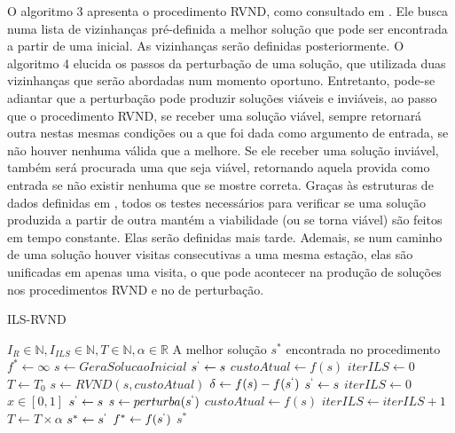 \par O algoritmo 3 apresenta o procedimento RVND, como consultado em \citep{art:REF_ART_7}. Ele busca numa lista de vizinhanças pré-definida a melhor solução que pode ser encontrada a partir de uma inicial. As vizinhanças serão definidas posteriormente. O algoritmo 4 elucida os passos da perturbação de uma solução, que utilizada duas vizinhanças que serão abordadas num momento oportuno. Entretanto, pode-se adiantar que a perturbação pode produzir soluções viáveis e inviáveis, ao passo que o procedimento RVND, se receber uma solução viável, sempre retornará outra nestas mesmas condições ou a que foi dada como argumento de entrada, se não houver nenhuma válida que a melhore. Se ele receber uma solução inviável, também será procurada uma que seja viável, retornando aquela provida como entrada se não existir nenhuma que se mostre correta. Graças às estruturas de dados definidas em \citep{art:REF_ART_4}, todos os testes necessários para verificar se uma solução produzida a partir de outra mantém a viabilidade (ou se torna viável) são feitos em tempo constante. Elas serão definidas mais tarde. Ademais, se num caminho de uma solução houver visitas consecutivas a uma mesma estação, elas são unificadas em apenas uma visita, o que pode acontecer na produção de soluções nos procedimentos RVND e no de perturbação.

    \begin{algorithm}[H]
    \caption{ILS-RVND}
    \begin{algorithmic}[1]
    \REQUIRE $I_R \in \mathbb{N}, I_{ILS} \in \mathbb{N}, T \in \mathbb{N}, \alpha \in \mathbb{R}$
    \ENSURE A melhor solução $s^*$ encontrada no procedimento
    \STATE $f^* \leftarrow \infty$
        \STATE $s \leftarrow GeraSolucaoInicial$
        \STATE $s^\lq \leftarrow s$
        \STATE $custoAtual \leftarrow f(s)$
        \STATE $iterILS \leftarrow 0$
        \STATE $T \leftarrow T_0$
            \STATE $s \leftarrow RVND(s, custoAtual)$
            \STATE $\delta \leftarrow f(s) - f(s^\lq)$
                \STATE $s^\lq \leftarrow s$
                \STATE $iterILS \leftarrow 0$
            \ELSE
                \STATE $x \in [0, 1]$
                    \STATE $s^\lq \leftarrow s$
                \ENDIF
            \ENDIF
            \STATE $s \leftarrow perturba(s^\lq)$
            \STATE $custoAtual \leftarrow f(s)$
            \STATE $iterILS \leftarrow iterILS + 1$
            \STATE $T \leftarrow T \times \alpha$
        \ENDWHILE
            \STATE $s^* \leftarrow s^\lq$
            \STATE $f^* \leftarrow f(s^\lq)$
        \ENDIF
    \ENDFOR
    \RETURN $s^*$
    \end{algorithmic}
    \end{algorithm}
    

